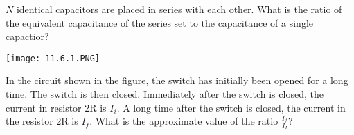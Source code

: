 \documentclass[../em.tex]{subfiles}
\begin{document}
\ex $N$ identical capacitors are placed in series with each other. What is the ratio of the equivalent capacitance of the series set to the capacitance of a single capactior?

\ex \begin{center}
    \texttt{[image: 11.6.1.PNG]}
\end{center}
In the circuit shown in the figure, the switch has initially been opened for a long time. The switch is then closed. Immediately after the switch is closed, the current in resistor 2R is $I_i$.
A long time after the switch is closed, the current in the resistor 2R is $I_f$. What is the approximate value of the ratio $\frac{I_f}{I_I}$?
\end{document}
